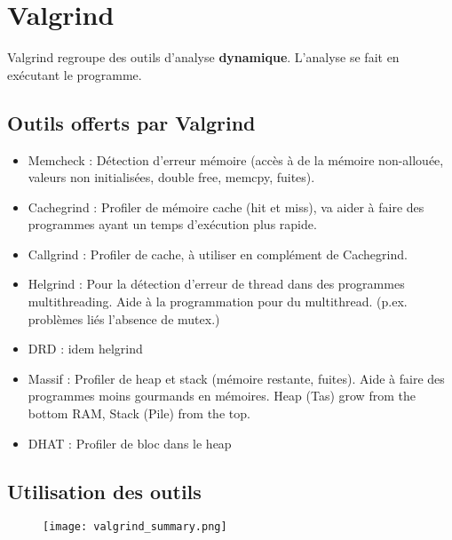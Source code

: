 \section{Valgrind}
Valgrind regroupe des outils d'analyse \textbf{dynamique}. L'analyse se fait en exécutant le programme.
\subsection{Outils offerts par Valgrind}
\begin{itemize}
    \item Memcheck : Détection d'erreur mémoire (accès à de la mémoire non-allouée, valeurs non initialisées, double free, memcpy, fuites).
    \item Cachegrind : Profiler de mémoire cache (hit et miss), va aider à faire des programmes ayant un temps d'exécution plus rapide.
    \item Callgrind : Profiler de cache, à utiliser en complément de Cachegrind.
    \item Helgrind : Pour la détection d'erreur de thread dans des programmes multithreading. Aide à la programmation pour du multithread. (p.ex. problèmes liés l'absence de mutex.)
    \item DRD : idem helgrind
    \item Massif : Profiler de heap et stack (mémoire restante, fuites). Aide à faire des programmes moins gourmands en mémoires. Heap (Tas) grow from the bottom RAM, Stack (Pile) from the top.
    \item DHAT : Profiler de bloc dans le heap
\end{itemize}
\subsection{Utilisation des outils}

\begin{figure}[H]
    \centering
    \texttt{[image: valgrind\_summary.png]}
\end{figure}

